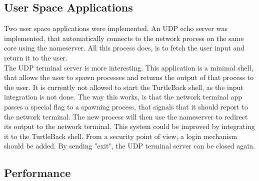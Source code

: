 \subsection{User Space Applications}
Two user space applications were implemented. An UDP echo server was implemented, that automatically connects to the network process on the same core using the nameserver. All this process does, is to fetch the user input and return it to the user.\\
The UDP terminal server is more interesting. This application is a minimal shell, that allows the user to spawn processes and returns the output of that process to the user. It is currently not allowed to start the TurtleBack shell, as the input integration is not done. The way this works, is that the network terminal app passes a special flag to a spawning process, that signals that it should report to the network terminal. The new process will then use the nameserver to redirect its output to the network terminal. This system could be improved by integrating it to the TurtleBack shell. From a security point of view, a login mechanism should be added. By sending "exit", the UDP terminal server can be closed again. 

\subsection{Performance}


